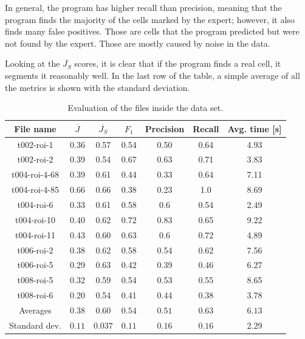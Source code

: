 \documentclass[
  digital,     %
  oneside,     %
  nosansbold,  %
  nocolorbold, %
  lof,         %
  lot,         %
]{fithesis4}
\begin{document}
In general, the program has higher recall than precision, meaning that the
program finds the majority of the cells marked by the expert; however, it also
finds many false positives. Those are cells that the program predicted but were
not found by the expert. Those are mostly caused by noise in the data.

Looking at the $\overline{J_S}$ scores, it is clear that if the program finds a
real cell, it segments it reasonably well. In the last row of the table, a simple average of all the metrics is shown with the standard deviation.

\begin{table}
    \hspace*{-0.5cm}\begin{tabular}{|| c|c|c|c|c|c|c ||}
        \toprule
        File name & $\overline{J}$ & $\overline{J_S}$ & \ensuremath{F_1} & Precision & Recall & Avg. time [s]\\
        \midrule
        t002-roi-1&0.36&0.57&0.54&0.50&0.64&4.93\\
        t002-roi-2&0.39&0.54&0.67&0.63&0.71&3.83\\
        t004-roi-4-68&0.39&0.61&0.44&0.33&0.64&7.11\\
        t004-roi-4-85&0.66&0.66&0.38&0.23&1.0&8.69\\
        t004-roi-6&0.33&0.61&0.58&0.6&0.54&2.49\\
        t004-roi-10&0.40&0.62&0.72&0.83&0.65&9.22\\
        t004-roi-11&0.43&0.60&0.63&0.6&0.72&4.89\\
        t006-roi-2&0.38&0.62&0.58&0.54&0.62&7.56\\
        t006-roi-5&0.29&0.63&0.42&0.39&0.46&6.27\\
        t008-roi-5&0.32&0.59&0.54&0.53&0.55&8.65\\
        t008-roi-6&0.20&0.54&0.41&0.44&0.38&3.78\\
        \midrule
        Averages&$0.38$&$0.60$&$0.54$&$0.51$&$0.63$&$6.13$\\
        Standard dev.&$0.11$&$0.037$&$0.11$&$0.16$&$0.16$&$2.29$\\
        \bottomrule
    \end{tabular}
    \caption{Evaluation of the files inside the data set.}
    \label{tab:scores}
\end{table}
\end{document}
